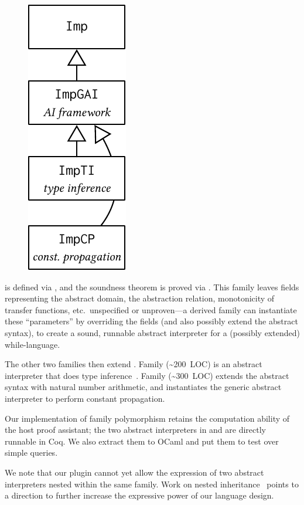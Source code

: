 \begin{figure}
\includegraphics[scale=.68]{graphics/ai-casestudy.pdf}
\end{figure}

\noindent
{} is defined via , and the soundness theorem
is proved via .
This family leaves fields representing the abstract domain, the
abstraction relation, monotonicity of transfer functions, etc.\ 
unspecified or unproven---a derived family can instantiate these
``parameters'' by overriding the fields (and also possibly extend the abstract syntax),
to create a sound, runnable abstract interpreter for a (possibly extended) while-language.

The other two families then extend .
Family  (\textasciitilde200~LOC) is an abstract
interpreter that does type inference~\cite{cousot1997types}.
Family  (\textasciitilde300~LOC) extends the abstract syntax
with natural number arithmetic,
and instantiates the generic abstract interpreter to perform constant propagation.

Our implementation of family polymorphism retains the computation
ability of the host proof assistant;
the two abstract interpreters in  and  are
directly runnable in Coq.
We also extract them to OCaml and put them to test over simple queries.

We note that our plugin cannot yet allow the expression of two abstract
interpreters nested within the same family.
Work on nested inheritance~\cite{ncm2004,zm2017} points to a direction
to further increase the expressive power of our language design.

